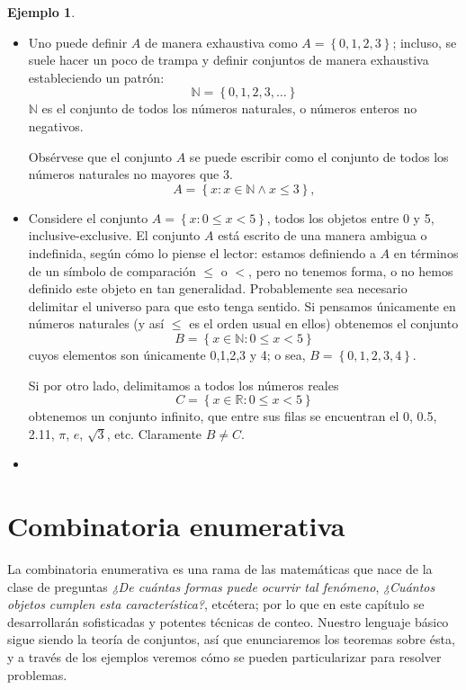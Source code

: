 \documentclass{book}
\newcommand{\set}[1]{\left\lbrace #1 \right\rbrace }
\theoremstyle{definition}
\newtheorem*{ejm}{Ejemplo}
\begin{document}
\begin{ejm}	\begin{itemize}
	\item Uno puede definir $A$ de manera exhaustiva como $A=\set{0,1,2,3}$; incluso, se suele hacer un poco de trampa y definir conjuntos de manera exhaustiva estableciendo un patrón:
	\[\mathbb{N} = \set{0,1,2,3,\ldots}\]
	$\mathbb{N}$ es el conjunto de todos los números naturales, o números enteros no negativos.
	
	Obsérvese que el conjunto $A$ se puede escribir como el conjunto de todos los números naturales no mayores que 3.
	\[A = \set{x : x \in \mathbb{N} \wedge x \leq 3},\]
	
	\item Considere el conjunto $A=\set{x : 0\leq x < 5}$, todos los objetos entre 0 y 5, inclusive-exclusive. El conjunto $A$ está escrito de una manera ambigua o indefinida, según cómo lo piense el lector: estamos definiendo a $A$ en términos de un símbolo de comparación $\leq$ o $<$, pero no tenemos forma, o no hemos definido este objeto en tan generalidad. Probablemente sea necesario delimitar el universo para que esto tenga sentido. 
	Si pensamos únicamente en números naturales (y así $\leq$ es el orden usual en ellos) obtenemos el conjunto
	\[B = \set{x \in \mathbb{N}: 0\leq x < 5}\]
	cuyos elementos son únicamente 0,1,2,3 y 4; o sea, $B = \set{0,1,2,3,4}$.
	
	Si por otro lado, delimitamos a todos los números reales
	\[C = \set{x \in \mathbb{R}: 0\leq x < 5}\]
	obtenemos un conjunto infinito, que entre sus filas se encuentran el 0, 0.5, 2.11, $\pi$, $e$, $\sqrt{3}$, etc.
	Claramente $B \neq C$.
	
	\item %
\end{itemize}\end{ejm}

\chapter{Combinatoria enumerativa}
\label{ch_combinatoriaEnumerativa}
La combinatoria enumerativa es una rama de las matemáticas que nace de la clase de preguntas \emph{¿De cuántas formas puede ocurrir tal fenómeno}, \emph{¿Cuántos objetos cumplen esta característica?}, etcétera; por lo que en este capítulo se desarrollarán  sofisticadas y potentes técnicas de conteo. Nuestro lenguaje básico sigue siendo la teoría de conjuntos, así que enunciaremos los teoremas sobre ésta, y a través de los ejemplos veremos cómo se pueden particularizar para resolver problemas.
\end{document}
